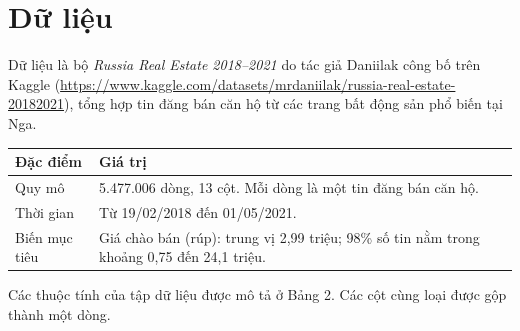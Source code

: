 \documentclass[12pt,a4paper]{article}
\newcommand{\hd}[1]{\textbf{#1}}
\begin{document}
\section{Dữ liệu}
Dữ liệu là bộ \emph{Russia Real Estate 2018--2021} do tác giả Daniilak công bố trên Kaggle (\url{https://www.kaggle.com/datasets/mrdaniilak/russia-real-estate-20182021}), tổng hợp tin đăng bán căn hộ từ các trang bất động sản phổ biến tại Nga.

\begin{center}
\small
\begin{tabularx}{\textwidth}{|>{\raggedright\arraybackslash}p{2.9cm}|X|}
\hline
\rowcolor{gray!20} \hd{Đặc điểm} & \hd{Giá trị} \\ \hline
Quy mô & 5.477.006 dòng, 13 cột. Mỗi dòng là một tin đăng bán căn hộ. \\ \hline
Thời gian & Từ 19/02/2018 đến 01/05/2021. \\ \hline
Biến mục tiêu & Giá chào bán (rúp): trung vị 2,99 triệu; 98\% số tin nằm trong khoảng 0,75 đến 24,1 triệu. \\ \hline
\end{tabularx}
\end{center}

Các thuộc tính của tập dữ liệu được mô tả ở Bảng 2. Các cột cùng loại được gộp thành một dòng.
\end{document}
